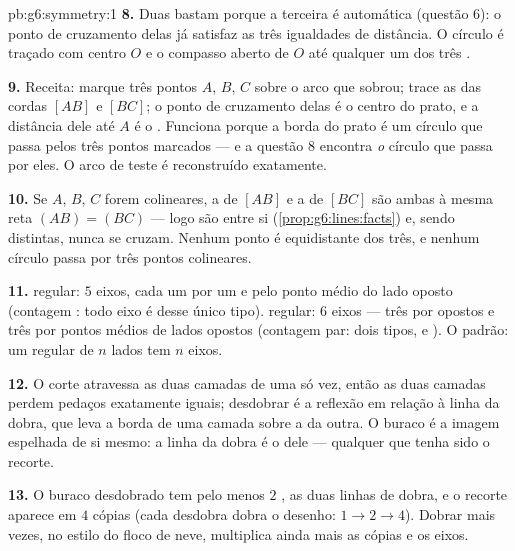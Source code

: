 \begin{solution}{pb:g6:symmetry:1}
\textbf{8.} Duas  bastam porque a terceira é automática
(questão 6): o ponto de cruzamento delas já satisfaz as três igualdades
de distância. O círculo é traçado com centro $O$ e o compasso aberto de
$O$ até qualquer um dos três .

\textbf{9.} Receita: marque três pontos $A$, $B$, $C$ sobre o arco que
sobrou; trace as  das cordas $[AB]$ e $[BC]$; o ponto de
cruzamento delas é o centro do prato, e a distância dele até $A$ é o
. Funciona porque a borda do prato é um círculo que passa pelos
três pontos marcados --- e a questão 8 encontra \emph{o} círculo que
passa por eles. O arco de teste é reconstruído exatamente.

\textbf{10.} Se $A$, $B$, $C$ forem colineares, a  de $[AB]$ e
a  de $[BC]$ são ambas  à mesma reta
$(AB) = (BC)$ --- logo são  entre si
(\cref{prop:g6:lines:facts}) e, sendo distintas, nunca se cruzam.
Nenhum ponto é equidistante dos três, e nenhum círculo passa por três
pontos colineares.

\textbf{11.}  regular: $5$ eixos, cada um por um  e
pelo ponto médio do lado oposto (contagem : todo eixo é desse
único tipo).  regular: $6$ eixos --- três por  opostos
e três por pontos médios de lados opostos (contagem par: dois tipos,
 e ). O padrão: um  regular de $n$ lados tem $n$
eixos.

\textbf{12.} O corte atravessa as duas camadas de uma só vez, então as
duas camadas perdem pedaços exatamente iguais; desdobrar é a reflexão
em relação à linha da dobra, que leva a borda de uma camada sobre a da
outra. O buraco é a imagem espelhada de si mesmo: a linha da dobra é o
 dele --- qualquer que tenha sido o recorte.

\textbf{13.} O buraco desdobrado tem pelo menos $2$ ,
as duas linhas de dobra, e o recorte aparece em $4$ cópias (cada
desdobra dobra o desenho: $1 \to 2 \to 4$). Dobrar mais vezes, no
estilo do floco de neve, multiplica ainda mais as cópias e os eixos.


\end{solution}

